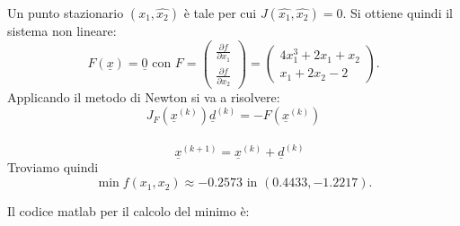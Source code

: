 Un punto stazionario $(\hat{x_1}, \hat{x_2})$ è tale per cui $J(\hat{x_1},\hat{x_2})=0$. Si ottiene quindi il sistema non lineare:
$$F(\underline{x})=\underline{0}\mbox{ con }F=\begin{pmatrix}\frac{\partial f}{\partial x_1}\\\frac{\partial f}{\partial x_2}\end{pmatrix}=\begin{pmatrix}4x_1^3+2x_1+x_2\\x_1+2x_2-2\end{pmatrix}.$$
Applicando il metodo di Newton si va a risolvere: $$J_F(\underline{x}^{(k)})\underline{d}^{(k)}=-F(\underline{x}^{(k)}) $$\\$$\quad \underline{x}^{(k+1)}=\underline{x}^{(k)}+\underline{d}^{(k)}$$
Troviamo quindi $$\min{f(x_1,x_2)}\approx -0.2573\mbox{ in }(0.4433, -1.2217).$$



Il codice matlab per il calcolo del minimo è:

